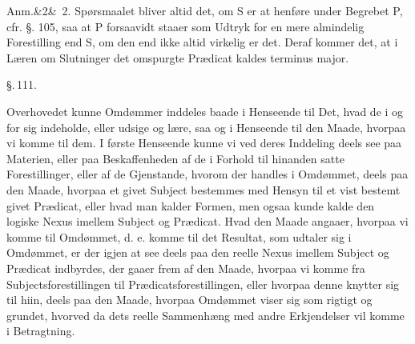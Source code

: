 \documentclass[12pt]{book}
\def\sperr#1{#1}%
\def\textit#1{#1}%
\def\emph#1{#1}%
\newcommand{\sperr}[1]{\textls[180]{#1}}
\newcommand{\parag}[1]{%
  \par\vspace{0.9\baselineskip}%
  {\centering\textit{\S.\,#1.}\par}%
  \vspace{0.35\baselineskip}%
  \noindent\hspace{\parindent}\ignorespaces
}
\newcommand{\anm}[1]{%
  \par\vspace{0.5\baselineskip}%
  \noindent\hspace{\parindent}\sperr{Anm.}\ifx&#1&\else~\textit{#1}.\fi
  \enspace\ignorespaces
}
\newcommand{\opage}[1]{\marginnote{\footnotesize\textit{[#1]}}}
\begin{document}
\anm{2} Spørsmaalet bliver altid det, om \textit{S} er at henføre under Begrebet \textit{P},
\textit{cfr.} §. 105, saa at \textit{P} forsaavidt staaer som Udtryk for en mere almindelig
Forestilling end \textit{S}, om den end ikke altid virkelig er det. Deraf kommer det, at i
Læren om Slutninger det omspurgte Prædicat kaldes \textit{terminus major}.

\opage{269} \parag{111}

Overhovedet kunne Omdømmer inddeles baade i Henseende til Det, hvad de i og for sig
indeholde, eller udsige og lære, saa og i Henseende til den Maade, hvorpaa vi komme til
dem. I første Henseende kunne vi ved deres Inddeling deels see paa \emph{Materien}, eller
paa Beskaffenheden af de i Forhold til hinanden satte Forestillinger, eller af de
Gjenstande, hvorom der handles i Omdømmet, deels paa den Maade, hvorpaa et givet Subject
bestemmes med Hensyn til et vist bestemt givet Prædicat, eller hvad man kalder
\emph{Formen}, men ogsaa kunde kalde den logiske \emph{Nexus} imellem Subject og Prædicat.
Hvad den Maade angaaer, hvorpaa vi komme til Omdømmet, d. e. komme til det Resultat, som
udtaler sig i Omdømmet, er der igjen at see deels paa den reelle \emph{Nexus} imellem
Subject og Prædicat indbyrdes, der gaaer frem af den Maade, hvorpaa vi komme fra
Subjectsforestillingen til Prædicatsforestillingen, eller hvorpaa denne knytter sig til
hiin, deels paa den Maade, hvorpaa Omdømmet viser sig som rigtigt og grundet, hvorved da
dets reelle Sammenhæng med andre Erkjendelser vil komme i Betragtning.
\end{document}
